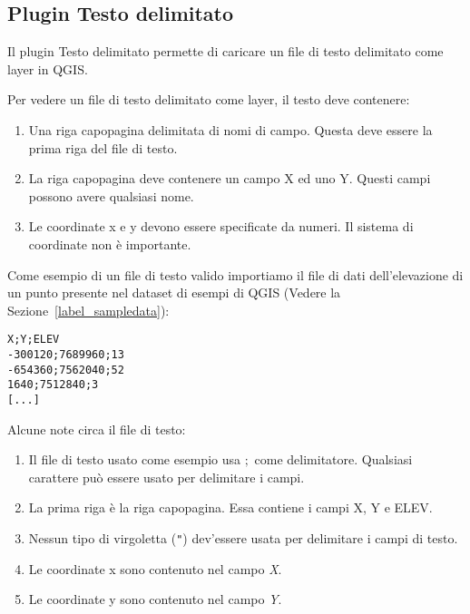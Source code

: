 
\subsection{Plugin Testo delimitato}\label{label_dltext}


Il plugin Testo delimitato permette di caricare un file di testo delimitato come layer in QGIS.


Per vedere un file di testo delimitato come layer, il testo deve contenere:

\begin{enumerate}
\item Una riga capopagina delimitata di nomi di campo. Questa deve essere la prima riga del file di testo.
\item La riga capopagina deve contenere un campo X ed uno Y. Questi campi possono avere qualsiasi nome.
\item Le coordinate x e y devono essere specificate da numeri. Il sistema di coordinate non è importante.
\end{enumerate}

Come esempio di un file di testo valido importiamo il file di dati dell'elevazione di un punto  presente nel dataset di esempi di QGIS (Vedere la Sezione~\ref{label_sampledata}):

\begin{verbatim} 
X;Y;ELEV
-300120;7689960;13
-654360;7562040;52
1640;7512840;3
[...]
\end{verbatim}

Alcune note circa il file di testo:

\begin{enumerate}
\item Il file di testo usato come esempio usa \mbox{$;$} come delimitatore. Qualsiasi carattere può essere usato per delimitare i campi.
\item La prima riga è la riga capopagina. Essa contiene i campi X, Y e ELEV.
\item Nessun tipo di virgoletta ({\tt{}"{}}) dev'essere usata per delimitare i campi di testo.
\item Le coordinate x sono contenuto nel campo {\em X}.
\item Le coordinate y sono contenuto nel campo {\em Y}.
\end{enumerate}

